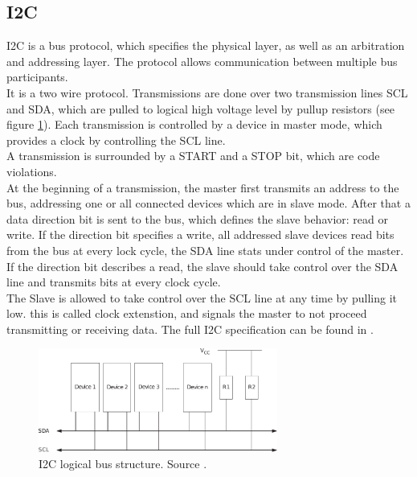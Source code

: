 \documentclass[a4paper]{scrreprt}
\begin{document}
\subsection{I2C}
I2C is a bus protocol, which specifies the physical layer, as well as an arbitration and addressing layer. The protocol allows communication between multiple bus participants.\\
It is a two wire protocol. Transmissions are done over two transmission lines SCL and SDA, which
are pulled to logical high voltage level by pullup resistors (see
figure \ref{fig:i2c}). Each transmission is controlled by a device
in master mode, which provides a clock by controlling the SCL line.\\
A transmission is surrounded by a START and a STOP bit, which are code violations.\\
At the beginning of a transmission, the master first transmits an
address to the bus, addressing one or all connected devices which
are in slave mode. After that a data direction bit is sent to the
bus, which defines the slave behavior: read or write. If the direction bit specifies a write, all addressed slave devices read bits from the bus at every 
lock cycle, the SDA line stats under control of the master. If the
direction bit describes a read, the slave should take control over
the SDA line and transmits bits at every clock cycle.\\
The Slave is allowed to take control over the SCL line at any time
by pulling it low. this is called clock extenstion, and signals the
master to not proceed transmitting or receiving data.
The full I2C specification can be found in \cite{i2c}.
\begin{figure}[Hh!]
	\centering
	\includegraphics[width=0.7\textwidth]{img/i2c.pdf}
  \caption{I2C logical bus structure. Source \cite{i2c}.}
	\label{fig:i2c}
\end{figure}
\end{document}
